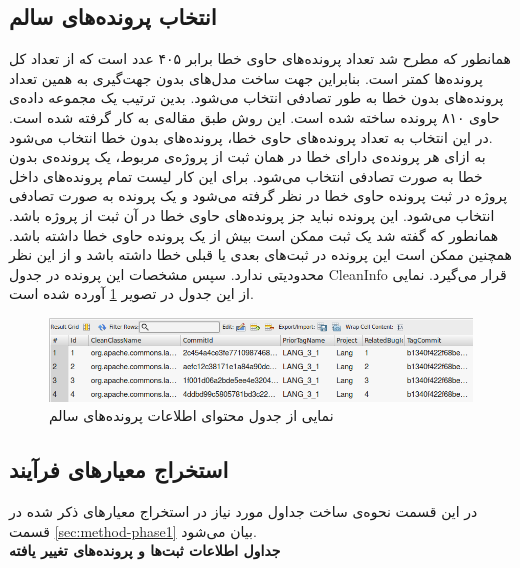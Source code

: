 \subsection{انتخاب پرونده‌های سالم}
همانطور که مطرح شد تعداد پرونده‌های حاوی خطا برابر ۴۰۵ عدد است که از تعداد کل پرونده‌ها کمتر است. بنابراین جهت ساخت مدل‌های بدون جهت‌گیری به همین تعداد پرونده‌های بدون خطا به طور تصادفی انتخاب می‌شود. بدین ترتیب یک مجموعه داده‌ی  حاوی ۸۱۰ پرونده ساخته شده است. این روش طبق مقاله‌ی \cite{johannessen2008data} به کار گرفته شده است. در این انتخاب به تعداد پرونده‌های حاوی خطا، پرونده‌های بدون خطا انتخاب می‌شود. \\به ازای هر پرونده‌ی دارای خطا در همان ثبت از پروژه‌ی مربوط، یک پرونده‌ی بدون خطا به صورت تصادفی انتخاب می‌شود. برای این کار لیست تمام پرونده‌های داخل پروژه در ثبت پرونده حاوی خطا در نظر گرفته می‌شود و یک پرونده به صورت تصادفی انتخاب می‌شود. این پرونده نباید جز پرونده‌های حاوی خطا در آن ثبت از  پروژه باشد.   همانطور که گفته شد یک ثبت ممکن است بیش از یک پرونده حاوی خطا داشته باشد. همچنین ممکن  است این پرونده در ثبت‌های بعدی یا قبلی خطا داشته باشد و از این نظر محدودیتی ندارد. سپس مشخصات این پرونده در جدول CleanInfo قرار می‌گیرد. نمایی از این جدول در تصویر \ref{fig:clean-info} آورده شده است.
\begin{figure}[H]
	\centering
	\includegraphics[width=1\textwidth]{img/case_study/clean-info.png}
	\caption{نمایی از جدول محتوای اطلاعات پرونده‌های سالم}
	\label{fig:clean-info}
\end{figure}



\subsection{ استخراج معیارهای فرآیند}
در  این قسمت نحوه‌ی ساخت جداول مورد نیاز در استخراج معیارهای ذکر شده در قسمت \ref{sec:method-phase1} بیان می‌شود. \\
\textbf{جداول اطلاعات ثبت‌ها و پرونده‌های تغییر یافته}


